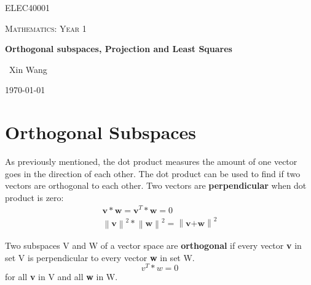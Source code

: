 \documentclass[10pt,a4paper]{article}
\begin{document}
\begin{titlepage}
	\centering
	{\scshape\LARGE ELEC40001 \par}
	\vspace{1cm}
	{\scshape\Large Mathematics: Year 1 \par}
	\vspace{1.5cm}
	{\huge\bfseries Orthogonal subspaces, Projection and Least Squares\par}
	\vspace{2cm}
	{\Large\ Xin Wang }
	\vfill
	{\large \today\par}
\end{titlepage}


\begin{abstract}
Sometimes the matrix system $A \textbf{\underbar{x}} = \textbf{\underbar{b}}$ is inconsistent and
does not have a solution. For example, satellite trajectory projections shown in the form of matrix systems sometimes do
not have exact solutions. There are certain methods available to find an \textbf{approximate} solution when an exact
solution does not exist.
\end{abstract}

\tableofcontents
\pagebreak

\section{Orthogonal Subspaces}

As previously mentioned, the dot product measures the amount of one vector goes in the direction of
each other. The dot product can be used to find if two vectors are orthogonal to each other. Two
vectors are \textbf{perpendicular} when dot product is zero:
\begin{align*}
	\textbf{v}*\textbf{w}=\textbf{v}^T*\textbf{w}=0 \\
	\left \| \textbf{v}\right \|^2*\left \| \textbf{w}\right\|^2=\left \| \textbf{v+w} \right \|^2
\end{align*}

\begin{tcolorbox}[breakable,colback=white]
Two subspaces V and W of a vector space are \textbf{orthogonal} if every vector \textbf{v} in set V is
perpendicular to every vector \textbf{w} in set W. $$v^T*w=0$$ for all \textbf{v} in V and all
\textbf{w} in W.
\end{tcolorbox}
\end{document}
